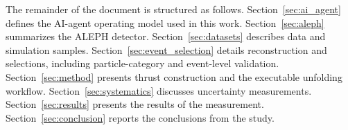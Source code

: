 The remainder of the document is structured as follows. Section~\ref{sec:ai_agent} defines the AI-agent operating model used in this work.
Section~\ref{sec:aleph} summarizes the ALEPH detector. Section~\ref{sec:datasets} describes data and simulation samples.
Section~\ref{sec:event_selection} details reconstruction and selections, including
particle-category and event-level validation. Section~\ref{sec:method} presents
thrust construction and the executable unfolding workflow.
Section~\ref{sec:systematics} discusses uncertainty measurements. Section~\ref{sec:results} presents the results of the measurement. Section~\ref{sec:conclusion} reports the conclusions from the study. 
